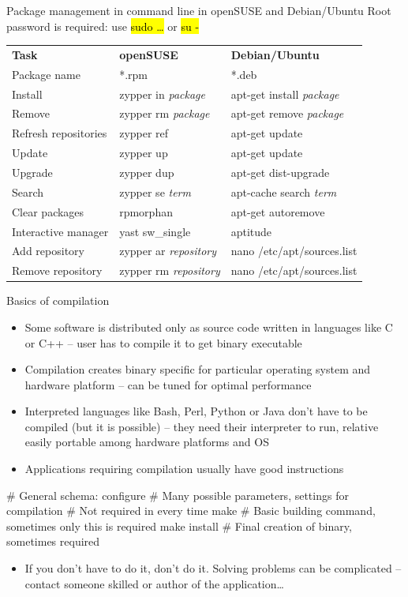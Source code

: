 \documentclass[compress, ucs, xelatex, 11pt, xcolor=svgnames,
  hyperref={
    bookmarks=true,
    unicode=true,
    colorlinks=true,
    pdftitle={Linux, command line and MetaCentrum},
    plainpages=false,
    pdfauthor={Vojtech Zeisek},
    pdfsubject={Course about use of Linux command line, writing shell scripts and using MetaCentrum of CESNET},
    pdfcreator={XeLaTeX},
    pdfkeywords={Linux, GNU, BASH, shell, command line, MetaCentrum},
    linkcolor=Red,
    anchorcolor=Blue,
    citecolor=Purple,
    filecolor=DodgerBlue,
    menucolor=DarkOrchid,
    urlcolor=DeepSkyBlue,
    pdftex},
  url={hyphens, lowtilde} %
  ]{beamer}
\renewcommand{\texttt}[1]{\hl{\ttfamily #1}}
\begin{document}
\begin{frame}{Package management in command line in openSUSE and Debian/Ubuntu}
Root password is required: use \texttt{sudo \ldots} or \texttt{su -}
\begin{center}
\begin{tabular}{lll}
\textbf{Task} & \textbf{openSUSE} & \textbf{Debian/Ubuntu}\\
Package name & *.rpm & *.deb\\
Install & zypper in \textit{package} & apt-get install \textit{package}\\
Remove & zypper rm \textit{package} & apt-get remove \textit{package}\\
Refresh repositories & zypper ref & apt-get update\\
Update & zypper up & apt-get update\\
Upgrade & zypper dup & apt-get dist-upgrade\\
Search & zypper se \textit{term} & apt-cache search \textit{term}\\
Clear packages & rpmorphan & apt-get autoremove\\
Interactive manager & yast sw\_single & aptitude\\
Add repository & zypper ar \textit{repository} & nano /etc/apt/sources.list\\
Remove repository & zypper rm \textit{repository} & nano /etc/apt/sources.list
\end{tabular}
\end{center}
\end{frame}

\begin{frame}[fragile]{Basics of compilation}
\begin{itemize}
  \item Some software is distributed only as source code written in languages like C or C++ -- user has to compile it to get binary executable
  \item Compilation creates binary specific for particular operating system and hardware platform -- can be tuned for optimal performance
  \item Interpreted languages like Bash, Perl, Python or Java don't have to be compiled (but it is possible) -- they need their interpreter to run, relative easily portable among hardware platforms and OS
  \item Applications requiring compilation usually have good instructions
\end{itemize}
  \begin{bashcode}
    # General schema:
    configure # Many possible parameters, settings for compilation
              # Not required in every time
    make # Basic building command, sometimes only this is required
    make install # Final creation of binary, sometimes required
  \end{bashcode}
\begin{itemize}
  \item If you don't have to do it, don't do it. Solving problems can be complicated -- contact someone skilled or author of the application\ldots
\end{itemize}
\end{frame}
\end{document}
